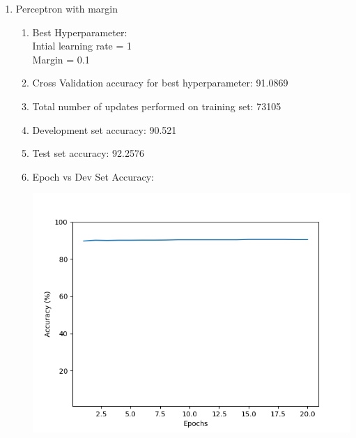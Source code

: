 \begin{enumerate}
\begin{enumerate}
		\item Perceptron with margin
			\begin{enumerate}
				\item Best Hyperparameter:\\ Intial learning rate = 1\\ Margin = 0.1
				\item Cross Validation accuracy for best hyperparameter: 91.0869
				\item Total number of updates performed on training set: 73105
				\item Development set accuracy: 90.521
				\item Test set accuracy: 92.2576
				\item Epoch vs Dev Set Accuracy:
					\begin{center}
						\includegraphics[scale=0.7]{Margin}
					\end{center}
			\end{enumerate}
			

\end{enumerate}
\end{enumerate}
